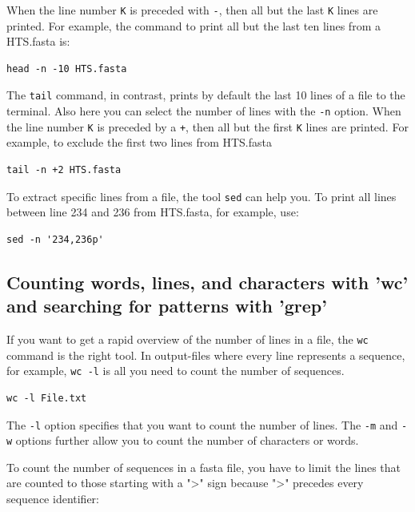 \documentclass[11pt]{article}
\begin{document}
When the line number \texttt{K} is preceded with \texttt{-}, then all but the last \texttt{K}
lines are printed. For example, the command to print all but the last
ten lines from a HTS.fasta is:

\begin{verbatim}
head -n -10 HTS.fasta
\end{verbatim}

The \texttt{tail} command, in contrast, prints by default the last 10 lines
of a file to the terminal. Also here you can select the number of
lines with the \texttt{-n} option. When the line number \texttt{K} is preceded by a
\texttt{+}, then all but the first \texttt{K} lines are printed.  For example, to
exclude the first two lines from HTS.fasta

\begin{verbatim}
tail -n +2 HTS.fasta
\end{verbatim}


To extract specific lines from a file, the tool \texttt{sed} can help you. To
print all lines between line 234 and 236 from HTS.fasta, for example, use:

\begin{verbatim}
sed -n '234,236p'
\end{verbatim}


\subsection{Counting words, lines, and characters with 'wc' and searching for patterns with 'grep'}
\label{sec-4-2}
If you want to get a rapid overview of the number of lines in a file,
the \texttt{wc} command is the right tool. In output-files where
every line represents a sequence, for example, \texttt{wc -l} is all you need to count the
number of sequences.

\begin{verbatim}
wc -l File.txt
\end{verbatim}

The \texttt{-l} option specifies that you want to count the number of
lines. The \texttt{-m} and \texttt{-w} options further allow you to count the number
of characters or words.


To count the number of sequences in a fasta file, you have to limit
the lines that are counted to those starting with a ">" sign
because ">" precedes every sequence identifier:
\end{document}

